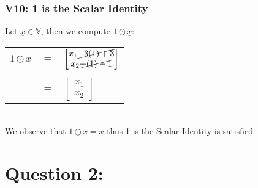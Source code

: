 \documentclass{article}
\begin{document}
\subsubsection*{V10: 1 is the Scalar Identity}
Let $\underline{x}\in\mathbb{V}$, then we compute $1\odot\underline{x}$:\\
\begin{table}[htp]
\centering
\begin{tabular}{ccl}
 $1\odot\underline{x}$& $=$  & $\begin{bmatrix} 
 x_{1}\cancel{-3(1)+3}\\
 x_{2}\cancel{+(1)-1}
 \end{bmatrix}$  \\
 &&\\
 & $=$ & $\begin{bmatrix} 
 x_{1}\\x_{2}
 \end{bmatrix}$  \\
\end{tabular}
\end{table}\\
We observe that $1\odot\underline{x}=\underline{x}$ thus 1 is the Scalar Identity is satisfied


\newpage
\section*{Question 2:}
\end{document}
